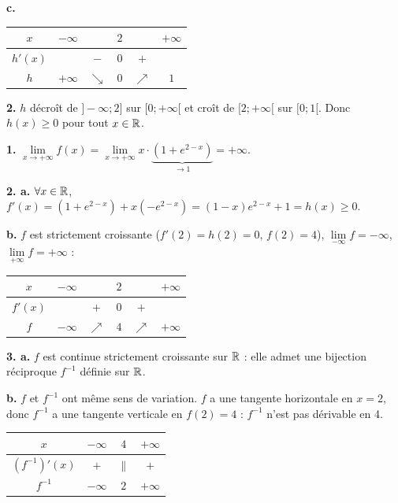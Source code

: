 \documentclass[11pt]{article}
\begin{document}
\textbf{c.}
\begin{center}\renewcommand{\arraystretch}{1.4}
\begin{tabular}{|c|ccccc|}
\hline $x$ & $-\infty$ & & $2$ & & $+\infty$ \\\hline $h'(x)$ & & $-$ & $0$ & $+$ & \\\hline $h$ & $+\infty$ & $\searrow$ & $0$ & $\nearrow$ & $1$ \\\hline
\end{tabular}
\end{center}

\textbf{2.} $h$ décroît de $]-\infty;2]$ sur $[0;+\infty[$ et croît de $[2;+\infty[$ sur $[0;1[$. Donc $h(x) \ge 0$ pour tout $x \in \mathbb{R}$.

\textbf{1.} $\lim\limits_{x\to+\infty} f(x) = \lim\limits_{x\to+\infty} x\cdot\underbrace{(1 + e^{2-x})}_{\to 1} = +\infty$.

\textbf{2. a.} $\forall x \in \mathbb{R}$, $f'(x) = (1 + e^{2-x}) + x(-e^{2-x}) = (1 - x)e^{2-x} + 1 = h(x) \ge 0$.

\textbf{b.} $f$ est strictement croissante ($f'(2) = h(2) = 0$, $f(2) = 4$), $\lim\limits_{-\infty} f = -\infty$, $\lim\limits_{+\infty} f = +\infty$ :
\begin{center}\renewcommand{\arraystretch}{1.4}
\begin{tabular}{|c|ccccc|}
\hline $x$ & $-\infty$ & & $2$ & & $+\infty$ \\\hline $f'(x)$ & & $+$ & $0$ & $+$ & \\\hline $f$ & $-\infty$ & $\nearrow$ & $4$ & $\nearrow$ & $+\infty$ \\\hline
\end{tabular}
\end{center}

\textbf{3. a.} $f$ est continue strictement croissante sur $\mathbb{R}$ : elle admet une bijection réciproque $f^{-1}$ définie sur $\mathbb{R}$.

\textbf{b.} $f$ et $f^{-1}$ ont même sens de variation. $f$ a une tangente horizontale en $x = 2$, donc $f^{-1}$ a une tangente verticale en $f(2) = 4$ : $f^{-1}$ n'est pas dérivable en 4.
\begin{center}\renewcommand{\arraystretch}{1.4}
\begin{tabular}{|c|ccc|}
\hline $x$ & $-\infty$ & $4$ & $+\infty$ \\\hline $(f^{-1})'(x)$ & $+$ & $\|$ & $+$ \\\hline $f^{-1}$ & $-\infty$ & $2$ & $+\infty$ \\\hline
\end{tabular}
\end{center}
\end{document}
